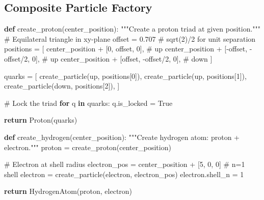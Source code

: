 \documentclass[
  11pt,
  letterpaper,
  twoside,
  openright]{book}
\newenvironment{Shaded}{\begin{snugshade}}{\end{snugshade}}
\newcommand{\CommentTok}[1]{\textcolor[rgb]{0.37,0.37,0.37}{#1}}
\newcommand{\ControlFlowTok}[1]{\textcolor[rgb]{0.00,0.23,0.31}{\textbf{#1}}}
\newcommand{\DecValTok}[1]{\textcolor[rgb]{0.68,0.00,0.00}{#1}}
\newcommand{\FloatTok}[1]{\textcolor[rgb]{0.68,0.00,0.00}{#1}}
\newcommand{\KeywordTok}[1]{\textcolor[rgb]{0.00,0.23,0.31}{\textbf{#1}}}
\newcommand{\NormalTok}[1]{\textcolor[rgb]{0.00,0.23,0.31}{#1}}
\newcommand{\OperatorTok}[1]{\textcolor[rgb]{0.37,0.37,0.37}{#1}}
\newcommand{\StringTok}[1]{\textcolor[rgb]{0.13,0.47,0.30}{#1}}
\newcommand{\VariableTok}[1]{\textcolor[rgb]{0.07,0.07,0.07}{#1}}
\begin{document}
\subsection{Composite Particle
Factory}\label{composite-particle-factory}

\begin{Shaded}
\begin{Highlighting}[]
\KeywordTok{def}\NormalTok{ create\_proton(center\_position):}
    \CommentTok{"""Create a proton triad at given position."""}
    \CommentTok{\# Equilateral triangle in xy{-}plane}
\NormalTok{    offset }\OperatorTok{=} \FloatTok{0.707}  \CommentTok{\# sqrt(2)/2 for unit separation}
\NormalTok{    positions }\OperatorTok{=}\NormalTok{ [}
\NormalTok{        center\_position }\OperatorTok{+}\NormalTok{ [}\DecValTok{0}\NormalTok{, offset, }\DecValTok{0}\NormalTok{],      }\CommentTok{\# up}
\NormalTok{        center\_position }\OperatorTok{+}\NormalTok{ [}\OperatorTok{{-}}\NormalTok{offset, }\OperatorTok{{-}}\NormalTok{offset}\OperatorTok{/}\DecValTok{2}\NormalTok{, }\DecValTok{0}\NormalTok{],  }\CommentTok{\# up}
\NormalTok{        center\_position }\OperatorTok{+}\NormalTok{ [offset, }\OperatorTok{{-}}\NormalTok{offset}\OperatorTok{/}\DecValTok{2}\NormalTok{, }\DecValTok{0}\NormalTok{],   }\CommentTok{\# down}
\NormalTok{    ]}

\NormalTok{    quarks }\OperatorTok{=}\NormalTok{ [}
\NormalTok{        create\_particle(}\StringTok{\textquotesingle{}up\textquotesingle{}}\NormalTok{, positions[}\DecValTok{0}\NormalTok{]),}
\NormalTok{        create\_particle(}\StringTok{\textquotesingle{}up\textquotesingle{}}\NormalTok{, positions[}\DecValTok{1}\NormalTok{]),}
\NormalTok{        create\_particle(}\StringTok{\textquotesingle{}down\textquotesingle{}}\NormalTok{, positions[}\DecValTok{2}\NormalTok{]),}
\NormalTok{    ]}

    \CommentTok{\# Lock the triad}
    \ControlFlowTok{for}\NormalTok{ q }\KeywordTok{in}\NormalTok{ quarks:}
\NormalTok{        q.is\_locked }\OperatorTok{=} \VariableTok{True}

    \ControlFlowTok{return}\NormalTok{ Proton(quarks)}

\KeywordTok{def}\NormalTok{ create\_hydrogen(center\_position):}
    \CommentTok{"""Create hydrogen atom: proton + electron."""}
\NormalTok{    proton }\OperatorTok{=}\NormalTok{ create\_proton(center\_position)}

    \CommentTok{\# Electron at shell radius}
\NormalTok{    electron\_pos }\OperatorTok{=}\NormalTok{ center\_position }\OperatorTok{+}\NormalTok{ [}\DecValTok{5}\NormalTok{, }\DecValTok{0}\NormalTok{, }\DecValTok{0}\NormalTok{]  }\CommentTok{\# n=1 shell}
\NormalTok{    electron }\OperatorTok{=}\NormalTok{ create\_particle(}\StringTok{\textquotesingle{}electron\textquotesingle{}}\NormalTok{, electron\_pos)}
\NormalTok{    electron.shell\_n }\OperatorTok{=} \DecValTok{1}

    \ControlFlowTok{return}\NormalTok{ HydrogenAtom(proton, electron)}
\end{Highlighting}
\end{Shaded}
\end{document}
